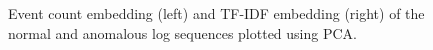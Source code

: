 \begin{figure}[h]%
    \centering
    \qquad
    \caption{Event count embedding (left) and TF-IDF embedding (right) of the normal and anomalous log sequences plotted using PCA.}%
    \label{fig:tf-vs-tfidf}%
\end{figure}

